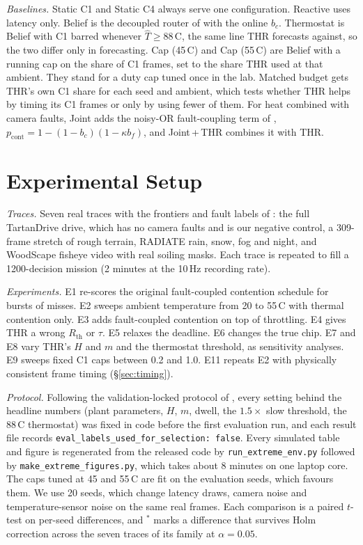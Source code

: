 \documentclass[conference,compsoc]{IEEEtran}
\newcommand{\degc}{\,\textdegree C}
\begin{document}
\textit{Baselines.} Static C1 and Static C4 always serve one
configuration. Reactive uses latency only. Belief is the decoupled
router of \cite{roy2026beliefspace} with the online $b_c$. Thermostat
is Belief with C1 barred whenever $\hat T\ge88$\degc, the same line THR
forecasts against, so the two differ only in forecasting. Cap (45\degc)
and Cap (55\degc) are Belief with a running cap on the share of C1
frames, set to the share THR used at that ambient. They stand for a
duty cap tuned once in the lab. Matched budget gets THR's own C1 share
for each seed and ambient, which tests whether THR helps by timing its
C1 frames or only by using fewer of them. For heat combined with camera
faults, Joint adds the noisy-OR fault-coupling term of
\cite{roy2026beliefspace}, $p_{\mathrm{cont}} = 1-(1-b_c)(1-\kappa b_f)$,
and Joint\,+\,THR combines it with THR.

\section{Experimental Setup}

\textit{Traces.} Seven real traces with the frontiers and fault labels
of \cite{roy2026beliefspace}: the full TartanDrive drive, which has
no camera faults and is our negative control, a 309-frame
stretch of rough terrain, RADIATE rain, snow, fog and night, and
WoodScape fisheye video with real soiling masks. Each trace is repeated
to fill a 1200-decision mission (2 minutes at the 10\,Hz recording
rate).

\textit{Experiments.} E1 re-scores the original fault-coupled contention
schedule for bursts of misses. E2 sweeps ambient temperature from 20 to
55\degc{} with thermal contention only. E3 adds fault-coupled
contention on top of throttling. E4 gives THR a wrong $R_{\mathrm{th}}$
or $\tau$. E5 relaxes the deadline. E6 changes the true chip. E7 and E8
vary THR's $H$ and $m$ and the thermostat threshold, as sensitivity
analyses. E9 sweeps fixed C1 caps between 0.2 and 1.0. E11 repeats
E2 with physically consistent frame timing (\S\ref{sec:timing}).

\textit{Protocol.} Following the validation-locked protocol of
\cite{zhou2026matchedinput}, every setting behind the headline numbers
(plant parameters, $H$, $m$, dwell, the $1.5\times$ slow threshold, the
88\degc{} thermostat) was fixed in code before the first evaluation
run, and each result file records
\texttt{eval\_labels\_used\_for\_selection: false}. Every simulated
table and figure is regenerated from the released code by
\texttt{run\_extreme\_env.py} followed by
\texttt{make\_extreme\_figures.py}, which takes about 8 minutes on one
laptop core. The caps tuned at
45 and 55\degc{} are fit on the evaluation seeds, which favours them.
We use 20 seeds, which change latency draws, camera noise and
temperature-sensor noise on the same real frames. Each comparison is a
paired $t$-test on per-seed differences, and $^\ast$ marks a difference
that survives Holm correction across the seven traces of its family at
$\alpha=0.05$.
\end{document}
